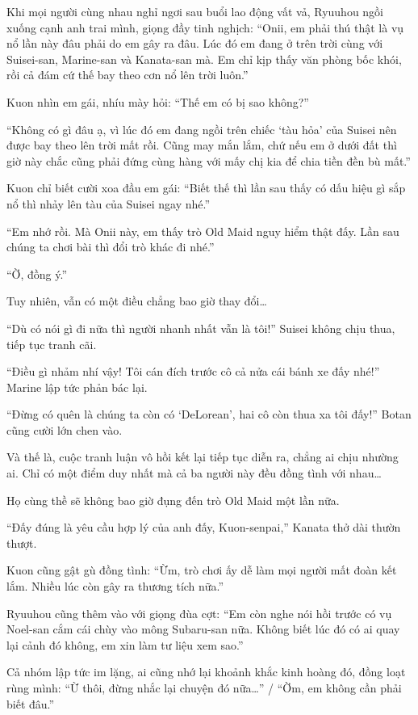\documentclass[../main.tex]{subfiles}
\begin{document}
Khi mọi người cùng nhau nghỉ ngơi sau buổi lao động vất vả, Ryuuhou ngồi xuống cạnh anh trai mình, giọng đầy tinh nghịch: ``Onii, em phải thú thật là vụ nổ lần này đâu phải do em gây ra đâu. Lúc đó em đang ở trên trời cùng với Suisei-san, Marine-san và Kanata-san mà. Em chỉ kịp thấy văn phòng bốc khói, rồi cả đám cứ thế bay theo cơn nổ lên trời luôn.''

Kuon nhìn em gái, nhíu mày hỏi: ``Thế em có bị sao không?''

``Không có gì đâu ạ, vì lúc đó em đang ngồi trên chiếc `tàu hỏa' của Suisei nên được bay theo lên trời mất rồi. Cũng may mắn lắm, chứ nếu em ở dưới đất thì giờ này chắc cũng phải đứng cùng hàng với mấy chị kia để chia tiền đền bù mất.''

Kuon chỉ biết cười xoa đầu em gái: ``Biết thế thì lần sau thấy có dấu hiệu gì sắp nổ thì nhảy lên tàu của Suisei ngay nhé.''

``Em nhớ rồi. Mà Onii này, em thấy trò Old Maid nguy hiểm thật đấy. Lần sau chúng ta chơi bài thì đổi trò khác đi nhé.''

``Ờ, đồng ý.''

Tuy nhiên, vẫn có một điều chẳng bao giờ thay đổi\dots

``Dù có nói gì đi nữa thì người nhanh nhất vẫn là tôi!'' Suisei không chịu thua, tiếp tục tranh cãi.

``Điều gì nhảm nhí vậy! Tôi cán đích trước cô cả nửa cái bánh xe đấy nhé!'' Marine lập tức phản bác lại.

``Đừng có quên là chúng ta còn có `DeLorean', hai cô còn thua xa tôi đấy!'' Botan cũng cười lớn chen vào.

Và thế là, cuộc tranh luận vô hồi kết lại tiếp tục diễn ra, chẳng ai chịu nhường ai. Chỉ có một điểm duy nhất mà cả ba người này đều đồng tình với nhau\dots

Họ cùng thề sẽ không bao giờ đụng đến trò Old Maid một lần nữa.

``Đấy đúng là yêu cầu hợp lý của anh đấy, Kuon-senpai,'' Kanata thở dài thườn thượt.

Kuon cũng gật gù đồng tình: ``Ừm, trò chơi ấy dễ làm mọi người mất đoàn kết lắm. Nhiều lúc còn gây ra thương tích nữa.''

Ryuuhou cũng thêm vào với giọng đùa cợt: ``Em còn nghe nói hồi trước có vụ Noel-san cắm cái chùy vào mông Subaru-san nữa. Không biết lúc đó có ai quay lại cảnh đó không, em xin làm tư liệu xem sao.''

Cả nhóm lập tức im lặng, ai cũng nhớ lại khoảnh khắc kinh hoàng đó, đồng loạt rùng mình: ``Ừ thôi, đừng nhắc lại chuyện đó nữa\dots'' / ``Ờm, em không cần phải biết đâu.''
\end{document}
